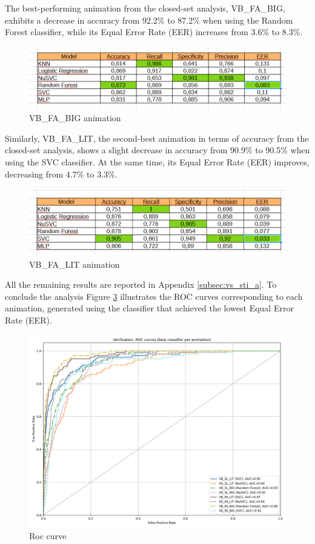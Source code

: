 \documentclass{article}
\begin{document}
The best-performing animation from the closed-set analysis, VB\_FA\_BIG, exhibits a decrease in accuracy from 92.2\% to 87.2\% when using the Random Forest classifier, while its Equal Error Rate (EER) increases from 3.6\% to 8.3\%.

\begin{figure}[ht]
    \centering
    \includegraphics[width = 0.8
    \textwidth]{Images/Results/Verification_single_intruders/st/VB_FA_BIG.png}
    \caption{VB\_FA\_BIG animation}
    \label{fig:VB_FA_BIG_sti}
\end{figure}

Similarly, VB\_FA\_LIT, the second-best animation in terms of accuracy from the closed-set analysis, shows a slight decrease in accuracy from 90.9\% to 90.5\% when using the SVC classifier.
At the same time, its Equal Error Rate (EER) improves, decreasing from 4.7\% to 3.3\%.

\begin{figure}[ht]
    \centering
    \includegraphics[width = 0.8
    \textwidth]{Images/Results/Verification_single_intruders/st/VB_FA_LIT.png}
    \caption{VB\_FA\_LIT animation}
    \label{fig:VB_FA_LIT_sti}
\end{figure}

All the remaining results are reported in Appendix \ref{subsec:vs_sti_a}.
To conclude the analysis Figure \ref{fig:roc_sti} illustrates the ROC curves corresponding to each animation, generated using the classifier that achieved the lowest Equal Error Rate (EER).

\begin{figure}[ht]
    \centering
    \includegraphics[width = 0.6
    \textwidth]{Images/Results/Verification_single_intruders/st/best_animation_roc_curves_st.png}
    \caption{Roc curve}
    \label{fig:roc_sti}
\end{figure}
\FloatBarrier
\end{document}
